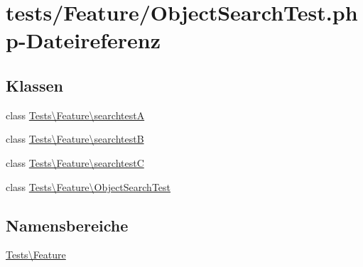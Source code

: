 \hypertarget{ObjectSearchTest_8php}{}\section{tests/\+Feature/\+Object\+Search\+Test.php-\/\+Dateireferenz}
\label{ObjectSearchTest_8php}
\subsection*{Klassen}
\begin{DoxyCompactItemize}
\item 
class \hyperlink{classTests_1_1Feature_1_1searchtestA}{Tests\textbackslash{}\+Feature\textbackslash{}searchtestA}
\item 
class \hyperlink{classTests_1_1Feature_1_1searchtestB}{Tests\textbackslash{}\+Feature\textbackslash{}searchtestB}
\item 
class \hyperlink{classTests_1_1Feature_1_1searchtestC}{Tests\textbackslash{}\+Feature\textbackslash{}searchtestC}
\item 
class \hyperlink{classTests_1_1Feature_1_1ObjectSearchTest}{Tests\textbackslash{}\+Feature\textbackslash{}\+Object\+Search\+Test}
\end{DoxyCompactItemize}
\subsection*{Namensbereiche}
\begin{DoxyCompactItemize}
\item 
 \hyperlink{namespaceTests_1_1Feature}{Tests\textbackslash{}\+Feature}
\end{DoxyCompactItemize}
